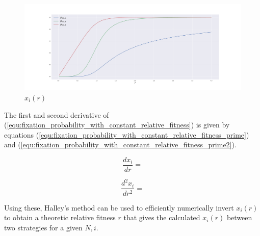 \documentclass{article}
\begin{document}
\begin{figure}[!hbtp]
    \centering
    \includegraphics[width=.6\textwidth]{./img/fixation_v_fitness_illustration.pdf}
    \caption{\(x_i(r)\)}
    \label{fig:fixation_v_fitness_illustration}
\end{figure}

The first and second derivative of
(\ref{equ:fixation_probability_with_constant_relative_fitness}) is given by equations
(\ref{equ:fixation_probability_with_constant_relative_fitness_prime}) and
(\ref{equ:fixation_probability_with_constant_relative_fitness_prime2}).

\begin{equation}\label{equ:fixation_probability_with_constant_relative_fitness_prime}
    \frac{dx_i}{dr} = 
\end{equation}

\begin{equation}\label{equ:fixation_probability_with_constant_relative_fitness_prime2}
    \frac{d^2x_i}{dr^2} = 
\end{equation}

Using these, Halley's method \cite{Alefeld2012} can be used to efficiently
numerically invert \(x_i(r)\) to obtain a theoretic relative fitness \(r\) that
gives the calculated \(x_i(r)\) between two strategies for a given \(N, i\).
\end{document}
